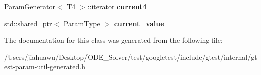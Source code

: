 \begin{DoxyCompactItemize}
\item 
\mbox{\label{classtesting_1_1internal_1_1_cartesian_product_generator4_1_1_iterator_a8c484c5e018ef121f0f49585e40983ed}} 
\mbox{\hyperlink{classtesting_1_1internal_1_1_param_generator}{Param\+Generator}}$<$ T4 $>$\+::iterator {\bfseries current4\+\_\+}
\item 
\mbox{\label{classtesting_1_1internal_1_1_cartesian_product_generator4_1_1_iterator_a8819c1279938f000d763feb7d10eb67e}} 
std\+::shared\+\_\+ptr$<$ Param\+Type $>$ {\bfseries current\+\_\+value\+\_\+}
\end{DoxyCompactItemize}


The documentation for this class was generated from the following file\+:\begin{DoxyCompactItemize}
\item 
/\+Users/jiahuawu/\+Desktop/\+O\+D\+E\+\_\+\+Solver/test/googletest/include/gtest/internal/gtest-\/param-\/util-\/generated.\+h\end{DoxyCompactItemize}
